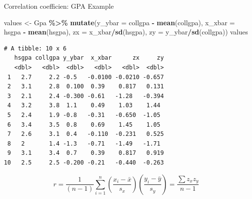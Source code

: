 \documentclass[
  ignorenonframetext,
]{beamer}
\newenvironment{Shaded}{\begin{snugshade}}{\end{snugshade}}
\newcommand{\AttributeTok}[1]{\textcolor[rgb]{0.13,0.29,0.53}{#1}}
\newcommand{\FunctionTok}[1]{\textcolor[rgb]{0.13,0.29,0.53}{\textbf{#1}}}
\newcommand{\NormalTok}[1]{#1}
\newcommand{\OtherTok}[1]{\textcolor[rgb]{0.56,0.35,0.01}{#1}}
\newcommand{\SpecialCharTok}[1]{\textcolor[rgb]{0.81,0.36,0.00}{\textbf{#1}}}
\begin{document}
\begin{frame}[fragile]{Correlation coefficien: GPA Example}
\protect\hypertarget{correlation-coefficien-gpa-example-1}{}
\small

\begin{Shaded}
\begin{Highlighting}[]
\NormalTok{values }\OtherTok{\textless{}{-}}\NormalTok{ Gpa }\SpecialCharTok{\%\textgreater{}\%} 
  \FunctionTok{mutate}\NormalTok{(}\AttributeTok{y\_ybar =}\NormalTok{ collgpa }\SpecialCharTok{{-}} \FunctionTok{mean}\NormalTok{(collgpa), }
         \AttributeTok{x\_xbar =}\NormalTok{ hsgpa }\SpecialCharTok{{-}} \FunctionTok{mean}\NormalTok{(hsgpa),}
         \AttributeTok{zx =}\NormalTok{ x\_xbar}\SpecialCharTok{/}\FunctionTok{sd}\NormalTok{(hsgpa), }\AttributeTok{zy =}\NormalTok{ y\_ybar}\SpecialCharTok{/}\FunctionTok{sd}\NormalTok{(collgpa))}
\NormalTok{values}
\end{Highlighting}
\end{Shaded}

\begin{verbatim}
# A tibble: 10 x 6
   hsgpa collgpa y_ybar  x_xbar      zx     zy
   <dbl>   <dbl>  <dbl>   <dbl>   <dbl>  <dbl>
 1   2.7     2.2 -0.5   -0.0100 -0.0210 -0.657
 2   3.1     2.8  0.100  0.39    0.817   0.131
 3   2.1     2.4 -0.300 -0.61   -1.28   -0.394
 4   3.2     3.8  1.1    0.49    1.03    1.44 
 5   2.4     1.9 -0.8   -0.31   -0.650  -1.05 
 6   3.4     3.5  0.8    0.69    1.45    1.05 
 7   2.6     3.1  0.4   -0.110  -0.231   0.525
 8   2       1.4 -1.3   -0.71   -1.49   -1.71 
 9   3.1     3.4  0.7    0.39    0.817   0.919
10   2.5     2.5 -0.200 -0.21   -0.440  -0.263
\end{verbatim}

\normalsize

\[r=\frac{1}{(n-1)}\sum_{i=1}^n \left(\frac{x_i-\bar{x}}{s_x}\right)\left(\frac{y_i-\bar{y}}{s_y}\right)=\frac{\sum z_x z_y}{n-1}\]
\end{frame}
\end{document}

